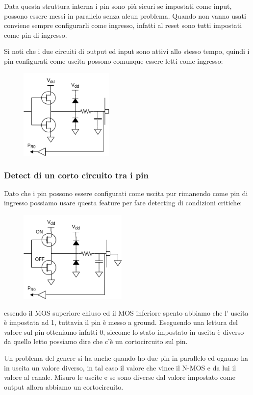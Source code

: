 Data questa struttura interna i pin sono più sicuri se impostati come input, possono essere messi in parallelo senza alcun problema.
Quando non vanno usati conviene sempre configurarli come ingresso, infatti al reset sono tutti impostati come pin di ingresso.

Si noti che i due circuiti di output ed input sono attivi allo stesso tempo, quindi i pin configurati come uscita possono comunque essere letti come ingresso:
\begin{figure}[H]
    \centering
    \includegraphics[width=175px]{images/21_GPIO/gpio_input_output.drawio.png}
\end{figure}

\subsubsection{Detect di un corto circuito tra i pin}
Dato che i pin possono essere configurati come uscita pur rimanendo come pin di ingresso possiamo usare questa feature per fare detecting di condizioni critiche:
\begin{figure}[H]
    \centering
    \includegraphics[width=200px]{images/21_GPIO/short_circuit_detection.png}
\end{figure}
essendo il MOS superiore chiuso ed il MOS inferiore spento abbiamo che l' uscita è impostata ad 1, tuttavia il pin è messo a ground.
Eseguendo una lettura del valore sul pin otteniamo infatti 0, siccome lo stato impostato in uscita è diverso da quello letto possiamo dire che c'è un cortocircuito sul pin.

Un problema del genere si ha anche quando ho due pin in parallelo ed ognuno ha in uscita un valore diverso, in tal caso il valore che vince il N-MOS e da lui il valore al canale.
Misuro le uscite e se sono diverse dal valore impostato come output allora abbiamo un cortocircuito.

